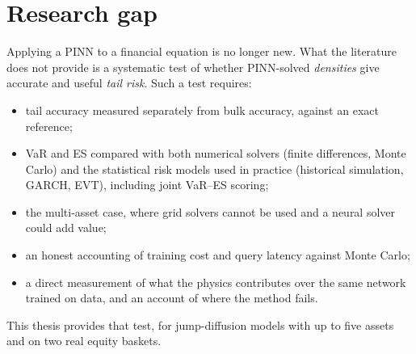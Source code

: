 \section{Research gap}
\label{sec:lit-gap}

Applying a PINN to a financial equation is no longer new. What the literature does not provide is a systematic
test of whether PINN-solved \emph{densities} give accurate and useful \emph{tail risk}. Such a test requires:
\begin{itemize}
  \item tail accuracy measured separately from bulk accuracy, against an exact reference;
  \item VaR and ES compared with both numerical solvers (finite differences, Monte Carlo) and the statistical risk
    models used in practice (historical simulation, GARCH, EVT), including joint VaR--ES scoring;
  \item the multi-asset case, where grid solvers cannot be used and a neural solver could add value;
  \item an honest accounting of training cost and query latency against Monte Carlo;
  \item a direct measurement of what the physics contributes over the same network trained on data, and an
    account of where the method fails.
\end{itemize}
This thesis provides that test, for jump-diffusion models with up to five assets and on two real equity baskets.
